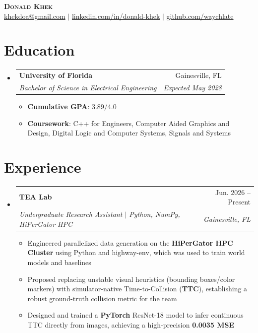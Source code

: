 \documentclass[letterpaper,11pt]{article}
\makeatletter
\newcommand{\resumeItem}[1]{
  \item{
    {#1 \vspace{-2pt}}
  }
}
\newcommand{\resumeSubheading}[4]{
  \vspace{-2pt}\item
    \begin{tabular*}{0.97\textwidth}[t]{l@{\extracolsep{\fill}}r}
      \textbf{#1} & #2 \\
      \textit{#3} & \textit{#4} \\
    \end{tabular*}\vspace{-7pt}
}
\newcommand{\resumeSubHeadingListStart}{\begin{itemize}[leftmargin=0.15in, label={}]}
\newcommand{\resumeSubHeadingListEnd}{\end{itemize}}
\newcommand{\resumeItemListStart}{\begin{itemize}}
\newcommand{\resumeItemListEnd}{\end{itemize}\vspace{-5pt}}
\makeatother
\begin{document}
\begin{center}
    \textbf{\Huge \scshape Donald Khek} \\ \vspace{1pt}
    \href{khekdoa@gmail.com}{{khekdoa@gmail.com}} $|$ \href{https://www.linkedin.com/in/donald-khek}{{linkedin.com/in/donald-khek}} $|$
    \href{https://github.com/waychlate}{{github.com/waychlate}}
\end{center}



\section {Education}
  \resumeSubHeadingListStart
    \resumeSubheading
      {University of Florida}{Gainesville, FL}
      {Bachelor of Science in Electrical Engineering} {Expected May 2028}
      	\resumeItemListStart
    	\resumeItem {\textbf{Cumulative GPA}: 3.89/4.0}
    	\resumeItem {\textbf{Coursework}: C++ for Engineers, Computer Aided Graphics and Design, Digital Logic and Computer Systems, Signals and Systems}
        \resumeItemListEnd
  \resumeSubHeadingListEnd

\section{Experience}
  \resumeSubHeadingListStart

  \resumeSubheading
    {TEA Lab}{Jun. 2026 -- Present}
    {Undergraduate Research Assistant $|$ {Python, NumPy, HiPerGator HPC}}{Gainesville, FL}
  \resumeItemListStart
    \resumeItem{Engineered parallelized data generation on the \textbf{HiPerGator HPC Cluster} using Python and highway-env, which was used to train world models and baselines}
    \resumeItem{Proposed replacing unstable visual heuristics (bounding boxes/color markers) with simulator-native Time-to-Collision (\textbf{TTC}), establishing a robust ground-truth collision metric for the team}
    \resumeItem{Designed and trained a \textbf{PyTorch} ResNet-18 model to infer continuous TTC directly from images, achieving a high-precision \textbf{0.0035 MSE}}
\resumeItemListEnd
  \resumeItemListEnd


\end{document}
